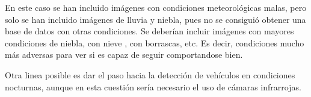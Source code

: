 En este caso se han incluido imágenes con condiciones meteorológicas malas, pero solo se han incluido imágenes de lluvia y niebla, pues no se consiguió obtener una base de datos con otras condiciones. Se deberían incluir imágenes con mayores condiciones de niebla, con nieve , con borrascas, etc. Es decir, condiciones mucho más adversas para ver si es capaz de seguir comportandose bien.

Otra linea posible es dar el paso hacia la detección de vehículos en condiciones nocturnas, aunque en esta cuestión sería necesario el uso de cámaras infrarrojas.







